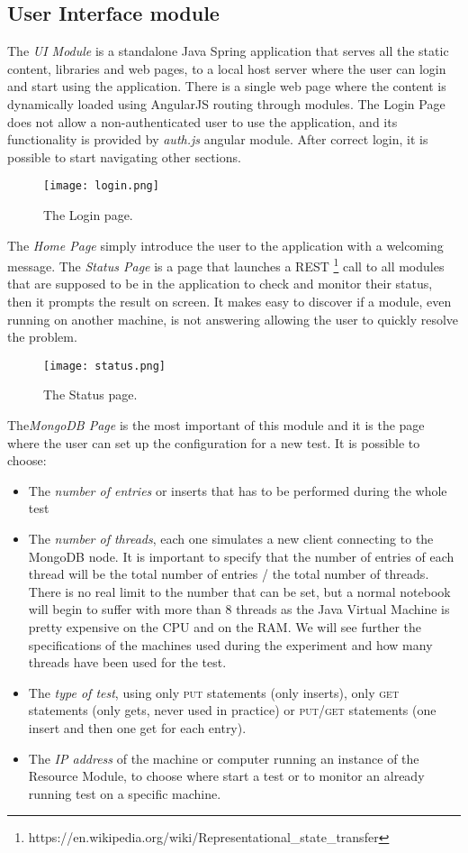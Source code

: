 \subsection{User Interface module}
The \textit{UI Module} is a standalone Java Spring application that serves all the static content, libraries and web pages, to a local host server where the user can login and start using the application. There is a single web page where the content is dynamically loaded using AngularJS routing through modules.
The Login Page does not allow a non-authenticated user to use the application, and its functionality is provided by \textit{auth.js} angular module. After correct login, it is possible to start navigating other sections.
\begin{figure}[H]
\texttt{[image: login.png]}
\centering
\caption{The Login page.}
\end{figure}
The \textit{Home Page} simply introduce the user to the application with a welcoming message.
The \textit{Status Page} is  a page that launches a REST \footnote{https://en.wikipedia.org/wiki/Representational\_state\_transfer} call to all modules that are supposed to be in the application to check and monitor their status, then it prompts the result on screen. It makes easy to discover if a module, even running on another machine, is not answering allowing the user to quickly resolve the problem.
\begin{figure}[H]
\texttt{[image: status.png]}
\centering
\caption{The Status page.}
\end{figure}
The\textit{MongoDB Page} is the most important of this module and  it is the page where the user can set up the configuration for a new test.
It is possible to choose:
\begin{itemize}
	\item The\textit{ number of entries} or inserts that has to be performed during the whole test
	\item The \textit{number of threads}, each one simulates a new client connecting to the MongoDB node. It is important to specify that the number of entries of each thread will be the total number of entries / the total number of threads. There is no real limit to the number that can be set, but a normal notebook will begin to suffer with more than 8 threads as the Java Virtual Machine is pretty expensive on the CPU and on the RAM. We will see further the specifications of the machines used during the experiment and how many threads have been used for the test.
	\item The \textit{type of test}, using only \textsc{put} statements (only inserts), only \textsc{get} statements (only gets, never used in practice) or \textsc{put/get} statements (one insert and then one get for each entry).
	\item The \textit{IP address} of the machine or computer running an instance of the Resource Module, to choose where start a test or to monitor an already running test on a specific machine.
\end{itemize}
